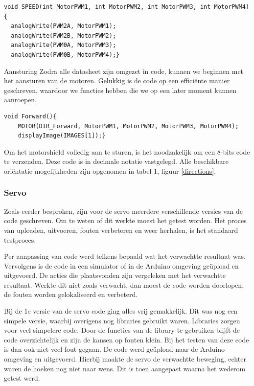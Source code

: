 \begin{lstlisting}
void SPEED(int MotorPWM1, int MotorPWM2, int MotorPWM3, int MotorPWM4){ 
  analogWrite(PWM2A, MotorPWM1); 
  analogWrite(PWM2B, MotorPWM2);
  analogWrite(PWM0A, MotorPWM3);
  analogWrite(PWM0B, MotorPWM4);}
\end{lstlisting}

Aansturing
Zodra alle datasheet \cite{shiftregister}\cite{h-brug} zijn omgezet in code, kunnen we beginnen met het aansturen van de motoren\cite{h-brug}. Gelukkig is de code op een efficiënte manier geschreven, waardoor we functies hebben die we op een later moment kunnen aanroepen. 
\begin{lstlisting}
void Forward(){
    MOTOR(DIR_Forward, MotorPWM1, MotorPWM2, MotorPWM3, MotorPWM4);
    displayImage(IMAGES[1]);}
\end{lstlisting}

Om het \gls{motorshield} volledig aan te sturen, is het noodzakelijk om een 8-bits code te verzenden. Deze code is in decimale notatie vastgelegd. Alle beschikbare oriëntatie mogelijkheden zijn opgenomen in tabel 1, figuur \ref{directions}.

\subsubsection{Servo}
Zoals eerder besproken, zijn voor de servo meerdere verschillende versies van de code geschreven. Om te weten of dit werkte moest het getest worden. Het proces van uploaden, uitvoeren, fouten verbeteren en weer herhalen, is het standaard testproces.

Per aanpassing van code werd telkens bepaald wat het verwachtte resultaat was. Vervolgens is de code in een simulator of in de Arduino omgeving geüpload en uitgevoerd. De acties die plaatsvonden zijn vergeleken met het verwachtte resultaat. Werkte dit niet zoals verwacht, dan moest de code worden doorlopen, de fouten worden gelokaliseerd en verbeterd. 

Bij de 1e versie van de servo code ging alles vrij gemakkelijk. Dit was nog een simpele versie, waarbij overigens nog libraries gebruikt waren. Libraries zorgen voor veel simpelere code. Door de functies van de library te gebruiken blijft de code overzichtelijk en zijn de kansen op fouten klein. Bij het testen van deze code is dan ook niet veel fout gegaan. De code werd geüpload naar de Arduino omgeving en uitgevoerd. Hierbij maakte de servo de verwachtte beweging, echter waren de hoeken nog niet naar wens. Dit is toen aangepast waarna het wederom getest werd. 

